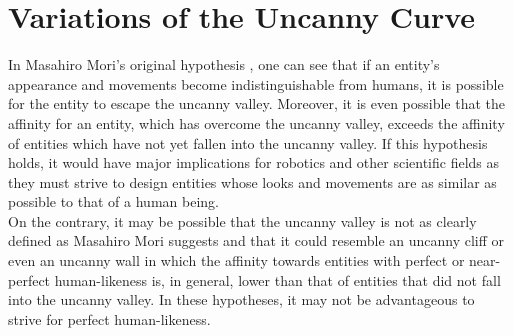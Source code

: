 \chapter{Variations of the Uncanny Curve}
\label{chap:3}
In Masahiro Mori’s original hypothesis \cite{original_masahiro}, one can see that if an entity's appearance and movements become indistinguishable from humans, it is possible for the entity to escape the uncanny valley. Moreover, it is even possible that the affinity for an entity, which has overcome the uncanny valley, exceeds the affinity of entities which have not yet fallen into the uncanny valley. If this hypothesis holds, it would have major implications for robotics and other scientific fields as they must strive to design entities whose looks and movements are as similar as possible to that of a human being.\\
On the contrary, it may be possible that the uncanny valley  is not as clearly defined as Masahiro Mori suggests and that it could resemble an uncanny cliff or even an uncanny wall in which the affinity towards entities with perfect or near-perfect human-likeness is, in general, lower than that of entities that did not fall into the uncanny valley. In these hypotheses, it may not be advantageous to strive for perfect human-likeness.

